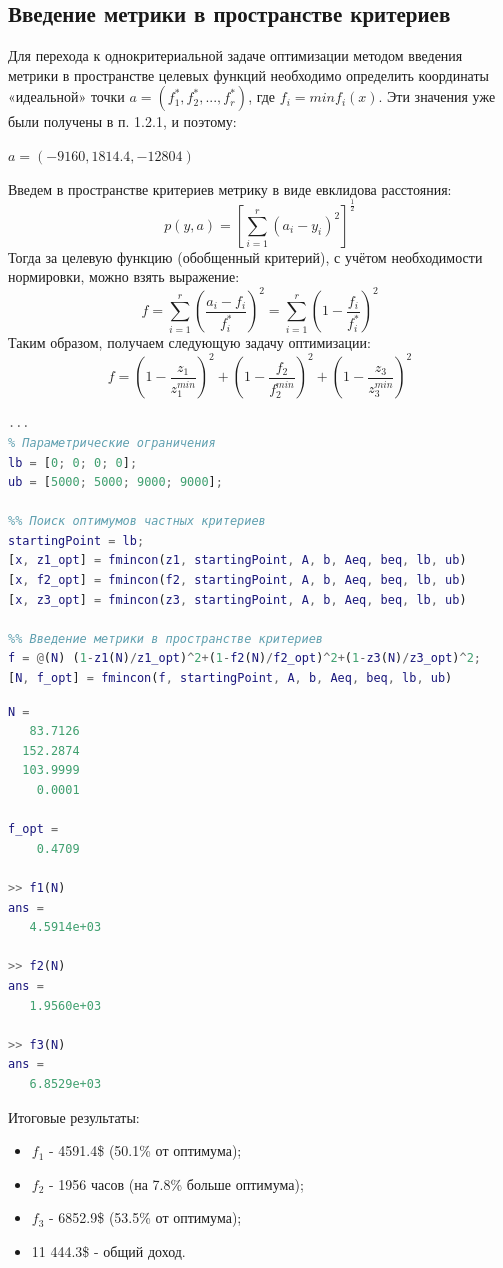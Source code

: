 \subsection{Введение метрики в пространстве критериев}
Для перехода к однокритериальной задаче оптимизации методом введения метрики в пространстве целевых функций необходимо определить координаты «идеальной» точки $a=(f_1^*, f_2^*, ..., f_r^*)$,  где $f_i = min f_i(x)$. Эти значения
уже были получены в п. 1.2.1, и поэтому:
\begin{center}
$a = (-9160, 1814.4, -12804)$
\end{center}
Введем в пространстве критериев метрику в виде евклидова расстояния:
\begin{equation}
p(y, a) = [\sum_{i=1}^r(a_i-y_i)^2]^{\frac{1}{2}} 
\end{equation}
Тогда за целевую функцию (обобщенный критерий), с учётом необходимости нормировки, можно взять выражение:
\begin{equation}
f=\sum_{i=1}^r(\frac{a_i-f_i}{f_i^*})^2=\sum_{i=1}^r(1-\frac{f_i}{f_i^*})^2
\end{equation}
Таким образом, получаем следующую задачу оптимизации:
\begin{equation}
f=(1-\frac{z_1}{z_1^{min}})^2+(1-\frac{f_2}{f_2^{min}})^2+(1-\frac{z_3}{z_3^{min}})^2
\end{equation}


\begin{lstlisting}[language={matlab}, caption={Метод достижения цели}]
...
% Параметрические ограничения
lb = [0; 0; 0; 0];
ub = [5000; 5000; 9000; 9000];

%% Поиск оптимумов частных критериев
startingPoint = lb;
[x, z1_opt] = fmincon(z1, startingPoint, A, b, Aeq, beq, lb, ub)
[x, f2_opt] = fmincon(f2, startingPoint, A, b, Aeq, beq, lb, ub)
[x, z3_opt] = fmincon(z3, startingPoint, A, b, Aeq, beq, lb, ub)

%% Введение метрики в пространстве критериев
f = @(N) (1-z1(N)/z1_opt)^2+(1-f2(N)/f2_opt)^2+(1-z3(N)/z3_opt)^2;
[N, f_opt] = fmincon(f, startingPoint, A, b, Aeq, beq, lb, ub)
\end{lstlisting}
\begin{lstlisting}[language={matlab}, caption={Результат выполнения}]
N =
   83.7126
  152.2874
  103.9999
    0.0001

f_opt =
    0.4709

>> f1(N)
ans =
   4.5914e+03

>> f2(N)
ans =
   1.9560e+03

>> f3(N)
ans =
   6.8529e+03
\end{lstlisting}
Итоговые результаты:
\begin{itemize}
\item $f_1$ - 4591.4\$ (50.1\% от оптимума);
\item $f_2$ - 1956 часов (на 7.8\% больше оптимума);
\item $f_3$ - 6852.9\$ (53.5\% от оптимума);
\item 11 444.3\$ - общий доход.
\end{itemize}

